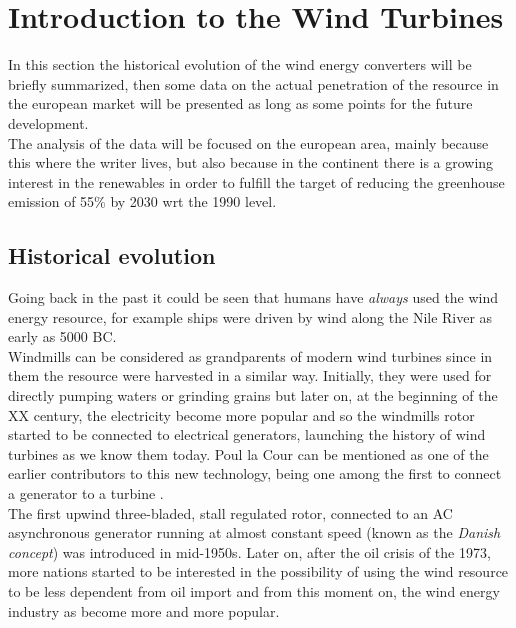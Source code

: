 \newpage
\section{Introduction to the Wind Turbines}\label{sec:c_WT_characteristics}
In this section the historical evolution of the wind energy converters will be briefly summarized, then some data on the actual penetration of the resource in the european market will be presented as long as some points for the future development. \\
The analysis of the data will be focused on the european area, mainly because this where the writer lives, but also because in the continent there is a growing interest in the renewables in order to fulfill the target of reducing the greenhouse emission of 55\% by 2030 wrt the 1990 level. 

\subsection{Historical evolution}
Going back in the past it could be seen that humans have \textit{always} used the wind energy resource, for example ships were driven by wind along the Nile River as early as 5000 BC.\\
Windmills can be considered as grandparents of modern wind turbines since in them the resource were harvested in a similar way. Initially, they were used for directly pumping waters or grinding grains but later on, at the beginning of the XX century, the electricity become more popular and so the windmills rotor started to be connected to electrical generators, launching the history of wind turbines as we know them today. Poul la Cour can be mentioned as one of the earlier contributors to this new technology, being one among the first to connect a generator to a turbine \cite{Aerodynamics_of_wind_turbines}. \\
The first upwind three-bladed, stall regulated rotor, connected to an AC asynchronous generator running at almost constant speed (known as the \textit{Danish concept}) was introduced in mid-1950s. Later on, after the oil crisis of the 1973, more nations started to be interested in the possibility of using the wind resource to be less dependent from oil import and from this moment on, the wind energy industry as become more and more popular. 

